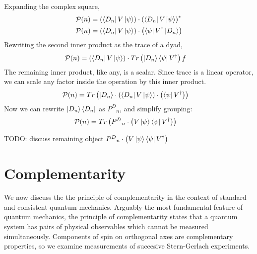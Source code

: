 Expanding the complex square,
\begin{align*}
  \mathcal{P}(n) &= \left(\bra{D_n}V\ket{\psi}\right) \cdot \left(\bra{D_n}V\ket{\psi}\right)^* \\
  \mathcal{P}(n) &= \left(\bra{D_n}V\ket{\psi}\right) \cdot \left(\bra{\psi}V^\dagger\ket{D_n}\right)
\end{align*}
Rewriting the second inner product as the trace of a dyad,
\begin{align*}
  \mathcal{P}(n) &= \left(\bra{D_n}V\ket{\psi}\right) \cdot Tr\left(\ket{D_n}\bra{\psi}V^\dagger\right)f
\end{align*}
The remaining inner product, like any, is a scalar. Since trace is a linear operator, we can scale any factor inside the operation by this inner product.
\begin{align*}
  \mathcal{P}(n) &= Tr\left(\ket{D_n} \cdot \left(\bra{D_n}V\ket{\psi}\right) \cdot \left(\bra{\psi}V^\dagger\right)\right)
\end{align*}
Now we can rewrite $\ket{D_n}\bra{D_n}$ as ${P^D}_n$, and simplify grouping:
\begin{align*}
  \mathcal{P}(n) &= Tr\left({P^D}_n \cdot \left(V\ket{\psi}\bra{\psi}V^\dagger\right)\right)
\end{align*}

TODO: discuss remaining object ${P^D}_n \cdot \left(V\ket{\psi}\bra{\psi}V^\dagger\right)$

\chapter{Complementarity}

We now discuss the the principle of complementarity in the context of standard and consistent quantum mechanics. Arguably the most fundamental feature of quantum mechanics, the principle of complementarity states that a quantum system has pairs of physical observables which cannot be measured simultaneously. Components of spin on orthogonal axes are complementary properties, so we examine measurements of succesive Stern-Gerlach experiments.

